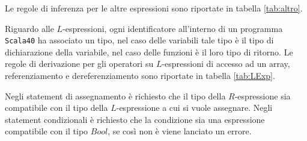 Le regole di inferenza per le altre espressioni sono riportate in tabella \ref{tab:altro}.

\begin{table}[]

\caption{Regole di derivazione per l'operatore di creazione di array e l'operatore condizionale.}
\label{tab:binari}
\end{table}

Riguardo alle $L$-espressioni, ogni identificatore all'interno di un programma \texttt{Scala40} ha associato un tipo, nel caso delle variabili tale tipo è il tipo di dichiarazione della variabile, nel caso delle funzioni è il loro tipo di ritorno. Le regole di derivazione per gli operatori su $L$-espressioni di accesso ad un array, referenziamento e dereferenziamento sono riportate in tabella \ref{tab:LExp}.

\begin{table}[]
\caption{Regole di derivazione per gli operatori su $L$-espressioni.}
\label{lab:LExp}
\end{table}

Negli statement di assegnamento è richiesto che il tipo della $R$-espressione sia compatibile con il tipo della $L$-espressione a cui si vuole assegnare.
Negli statement condizionali è richiesto che la condizione sia una espressione compatibile con il tipo $Bool$, se così non è viene lanciato un errore.

